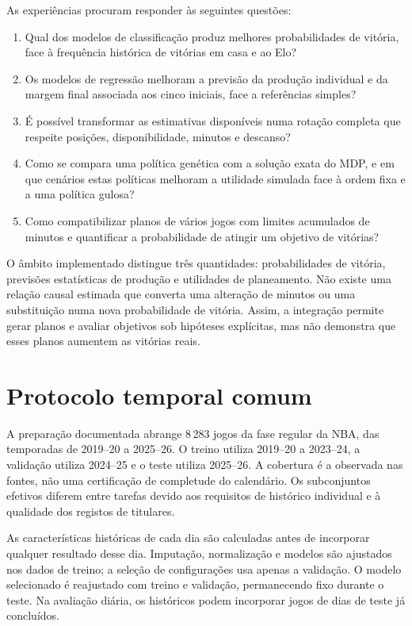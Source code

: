 As experiências procuram responder às seguintes questões:
\begin{enumerate}
\item Qual dos modelos de classificação produz melhores probabilidades
 de vitória, face à frequência histórica de vitórias em casa e ao Elo?
\item Os modelos de regressão melhoram a previsão da produção individual
 e da margem final associada aos cinco iniciais, face a referências simples?
\item É possível transformar as estimativas disponíveis numa rotação
 completa que respeite posições, disponibilidade, minutos e descanso?
\item Como se compara uma política genética com a solução exata do MDP,
 e em que cenários estas políticas melhoram a utilidade simulada face
 à ordem fixa e a uma política gulosa?
\item Como compatibilizar planos de vários jogos com limites acumulados
 de minutos e quantificar a probabilidade de atingir um objetivo de vitórias?
\end{enumerate}

O âmbito implementado distingue três quantidades: probabilidades de
vitória, previsões estatísticas de produção e utilidades de planeamento.
Não existe uma relação causal estimada que converta uma alteração de
minutos ou uma substituição numa nova probabilidade de vitória. Assim,
a integração permite gerar planos e avaliar objetivos sob hipóteses
explícitas, mas não demonstra que esses planos aumentem as vitórias reais.

\section{Protocolo temporal comum}

A preparação documentada abrange 8\,283 jogos da fase regular da NBA, das
temporadas de 2019--20 a 2025--26. O treino utiliza 2019--20 a 2023--24,
a validação utiliza 2024--25 e o teste utiliza 2025--26. A cobertura é a
observada nas fontes, não uma certificação de completude do calendário.
Os subconjuntos efetivos diferem entre tarefas devido aos requisitos de
histórico individual e à qualidade dos registos de titulares.

As características históricas de cada dia são calculadas antes de
incorporar qualquer resultado desse dia. Imputação, normalização e modelos
são ajustados nos dados de treino; a seleção de configurações usa apenas
a validação. O modelo selecionado é reajustado com treino e validação,
permanecendo fixo durante o teste. Na avaliação diária, os históricos
podem incorporar jogos de dias de teste já concluídos.

